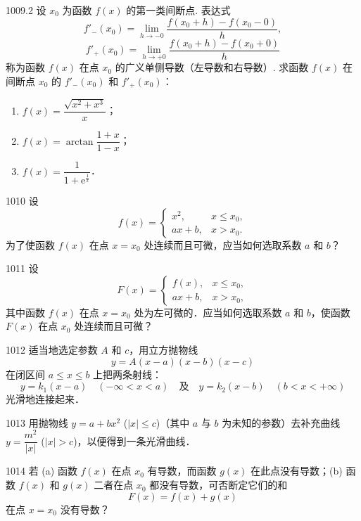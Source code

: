 \begin{prob}[M]{1009.2}
设 $x_0$ 为函数 $f(x)$ 的第一类间断点. 表达式
\[
f'_-(x_0) = \lim_{h \to -0} \frac{f(x_0 + h) - f(x_0 - 0)}{h},
\]
\[
f'_+(x_0) = \lim_{h \to +0} \frac{f(x_0 + h) - f(x_0 + 0)}{h}
\]
称为函数 $f(x)$ 在点 $x_0$ 的广义单侧导数（左导数和右导数）.
求函数 $f(x)$ 在间断点 $x_0$ 的 $f'_-(x_0)$ 和 $f'_+(x_0)$：
\begin{enumerate}[label=(\alph*), itemsep=2pt, topsep=3pt]
  \item $f(x) = \dfrac{\sqrt{x^2 + x^3}}{x}$；
  \item $f(x) = \arctan \dfrac{1+x}{1-x}$；
  \item $f(x) = \dfrac{1}{1 + \mathrm{e}^{\frac{1}{x}}}$．
\end{enumerate}
\end{prob}

\begin{prob}[M]{1010}
设
\[
f(x) = \begin{cases}
x^2, & x \leqslant x_0, \\
ax + b, & x > x_0.
\end{cases}
\]
为了使函数 $f(x)$ 在点 $x = x_0$ 处连续而且可微，应当如何选取系数 $a$ 和 $b$？
\end{prob}

\begin{prob}[M]{1011}
设
\[
F(x) = \begin{cases}
f(x), & x \leqslant x_0, \\
ax + b, & x > x_0,
\end{cases}
\]
其中函数 $f(x)$ 在点 $x = x_0$ 处为左可微的．应当如何选取系数 $a$ 和 $b$，使函数 $F(x)$ 在点 $x_0$ 处连续而且可微？
\end{prob}

\begin{prob}[M]{1012}
适当地选定参数 $A$ 和 $c$，用立方抛物线
\[
y = A(x - a)(x - b)(x - c)
\]
在闭区间 $a \leqslant x \leqslant b$ 上把两条射线：
\[
y = k_1(x - a) \quad (-\infty < x < a) \quad \text{及} \quad y = k_2(x - b) \quad (b < x < +\infty)
\]
光滑地连接起来．
\end{prob}

\begin{prob}[M]{1013}
用抛物线 $y = a + bx^2$ ($|x| \leqslant c$)（其中 $a$ 与 $b$ 为未知的参数）去补充曲线 $y = \dfrac{m^2}{|x|}$ ($|x| > c$)，以便得到一条光滑曲线．
\end{prob}

\begin{prob}[M]{1014}
若 (a) 函数 $f(x)$ 在点 $x_0$ 有导数，而函数 $g(x)$ 在此点没有导数；(b) 函数 $f(x)$ 和 $g(x)$ 二者在点 $x_0$ 都没有导数，可否断定它们的和
\[
F(x) = f(x) + g(x)
\]
在点 $x = x_0$ 没有导数？
\end{prob}

